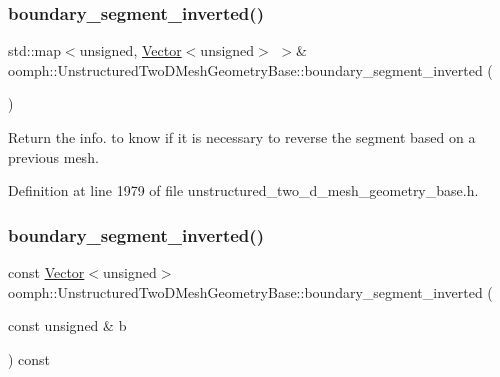 \subsubsection{\texorpdfstring{boundary\+\_\+segment\+\_\+inverted()}{boundary\_segment\_inverted()}\hspace{0.1cm}{\footnotesize\ttfamily [1/3]}}
{\footnotesize\ttfamily std\+::map$<$unsigned, \hyperlink{classoomph_1_1Vector}{Vector}$<$unsigned$>$ $>$\& oomph\+::\+Unstructured\+Two\+D\+Mesh\+Geometry\+Base\+::boundary\+\_\+segment\+\_\+inverted (\begin{DoxyParamCaption}{ }\end{DoxyParamCaption})\hspace{0.3cm}{\ttfamily [inline]}}



Return the info. to know if it is necessary to reverse the segment based on a previous mesh. 



Definition at line 1979 of file unstructured\+\_\+two\+\_\+d\+\_\+mesh\+\_\+geometry\+\_\+base.\+h.

\mbox{\label{classoomph_1_1UnstructuredTwoDMeshGeometryBase_a0ff7b48dd70784f8128cd5ec494e3efa}} 
\subsubsection{\texorpdfstring{boundary\+\_\+segment\+\_\+inverted()}{boundary\_segment\_inverted()}\hspace{0.1cm}{\footnotesize\ttfamily [2/3]}}
{\footnotesize\ttfamily const \hyperlink{classoomph_1_1Vector}{Vector}$<$unsigned$>$ oomph\+::\+Unstructured\+Two\+D\+Mesh\+Geometry\+Base\+::boundary\+\_\+segment\+\_\+inverted (\begin{DoxyParamCaption}\item[{const unsigned \&}]{b }\end{DoxyParamCaption}) const\hspace{0.3cm}{\ttfamily [inline]}}



